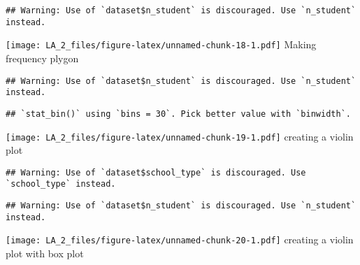\documentclass[
]{article}
\newenvironment{Shaded}{\begin{snugshade}}{\end{snugshade}}
\newcommand{\AttributeTok}[1]{\textcolor[rgb]{0.77,0.63,0.00}{#1}}
\newcommand{\FunctionTok}[1]{\textcolor[rgb]{0.00,0.00,0.00}{#1}}
\newcommand{\NormalTok}[1]{#1}
\newcommand{\SpecialCharTok}[1]{\textcolor[rgb]{0.00,0.00,0.00}{#1}}
\begin{document}
\begin{verbatim}
## Warning: Use of `dataset$n_student` is discouraged. Use `n_student` instead.
\end{verbatim}

\texttt{[image: LA\_2\_files/figure-latex/unnamed-chunk-18-1.pdf]} Making
frequency plygon

\begin{Shaded}
\end{Shaded}

\begin{verbatim}
## Warning: Use of `dataset$n_student` is discouraged. Use `n_student` instead.
\end{verbatim}

\begin{verbatim}
## `stat_bin()` using `bins = 30`. Pick better value with `binwidth`.
\end{verbatim}

\texttt{[image: LA\_2\_files/figure-latex/unnamed-chunk-19-1.pdf]}
creating a violin plot

\begin{Shaded}
\end{Shaded}

\begin{verbatim}
## Warning: Use of `dataset$school_type` is discouraged. Use `school_type` instead.
\end{verbatim}

\begin{verbatim}
## Warning: Use of `dataset$n_student` is discouraged. Use `n_student` instead.
\end{verbatim}

\texttt{[image: LA\_2\_files/figure-latex/unnamed-chunk-20-1.pdf]}
creating a violin plot with box plot
\end{document}
